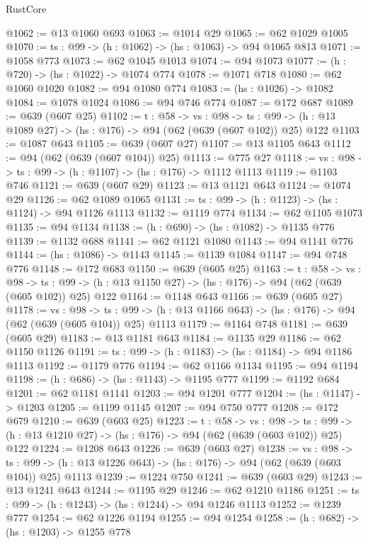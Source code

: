 \begin{lexlean}{RustCore}
\begin{coremodule}
@1062 := @13 @1060 @693
@1063 := @1014 @29
@1065 := @62 @1029 @1005
@1070 := {ts : @99} -> (h : @1062) -> (hs : @1063) -> @94 @1065 @813
@1071 := @1058 @773
@1073 := @62 @1045 @1013
@1074 := @94 @1073
@1077 := (h : @720) -> (hs : @1022) -> @1074 @774
@1078 := @1071 @718
@1080 := @62 @1060 @1020
@1082 := @94 @1080 @774
@1083 := (hs : @1026) -> @1082
@1084 := @1078 @1024
@1086 := @94 @746 @774
@1087 := @172 @687
@1089 := @639 (@607 @25)
@1102 := {t : @58} ->
  {vs : @98} ->
  {ts : @99} -> (h : @13 @1089 @27) -> (hs : @176) -> @94 (@62 (@639 (@607 @102)) @25) @122
@1103 := @1087 @643
@1105 := @639 (@607 @27)
@1107 := @13 @1105 @643
@1112 := @94 (@62 (@639 (@607 @104)) @25)
@1113 := @775 @27
@1118 := {vs : @98} -> {ts : @99} -> (h : @1107) -> (hs : @176) -> @1112 @1113
@1119 := @1103 @746
@1121 := @639 (@607 @29)
@1123 := @13 @1121 @643
@1124 := @1074 @29
@1126 := @62 @1089 @1065
@1131 := {ts : @99} -> (h : @1123) -> (hs : @1124) -> @94 @1126 @1113
@1132 := @1119 @774
@1134 := @62 @1105 @1073
@1135 := @94 @1134
@1138 := (h : @690) -> (hs : @1082) -> @1135 @776
@1139 := @1132 @688
@1141 := @62 @1121 @1080
@1143 := @94 @1141 @776
@1144 := (hs : @1086) -> @1143
@1145 := @1139 @1084
@1147 := @94 @748 @776
@1148 := @172 @683
@1150 := @639 (@605 @25)
@1163 := {t : @58} ->
  {vs : @98} ->
  {ts : @99} -> (h : @13 @1150 @27) -> (hs : @176) -> @94 (@62 (@639 (@605 @102)) @25) @122
@1164 := @1148 @643
@1166 := @639 (@605 @27)
@1178 := {vs : @98} ->
  {ts : @99} -> (h : @13 @1166 @643) -> (hs : @176) -> @94 (@62 (@639 (@605 @104)) @25) @1113
@1179 := @1164 @748
@1181 := @639 (@605 @29)
@1183 := @13 @1181 @643
@1184 := @1135 @29
@1186 := @62 @1150 @1126
@1191 := {ts : @99} -> (h : @1183) -> (hs : @1184) -> @94 @1186 @1113
@1192 := @1179 @776
@1194 := @62 @1166 @1134
@1195 := @94 @1194
@1198 := (h : @686) -> (hs : @1143) -> @1195 @777
@1199 := @1192 @684
@1201 := @62 @1181 @1141
@1203 := @94 @1201 @777
@1204 := (hs : @1147) -> @1203
@1205 := @1199 @1145
@1207 := @94 @750 @777
@1208 := @172 @679
@1210 := @639 (@603 @25)
@1223 := {t : @58} ->
  {vs : @98} ->
  {ts : @99} -> (h : @13 @1210 @27) -> (hs : @176) -> @94 (@62 (@639 (@603 @102)) @25) @122
@1224 := @1208 @643
@1226 := @639 (@603 @27)
@1238 := {vs : @98} ->
  {ts : @99} -> (h : @13 @1226 @643) -> (hs : @176) -> @94 (@62 (@639 (@603 @104)) @25) @1113
@1239 := @1224 @750
@1241 := @639 (@603 @29)
@1243 := @13 @1241 @643
@1244 := @1195 @29
@1246 := @62 @1210 @1186
@1251 := {ts : @99} -> (h : @1243) -> (hs : @1244) -> @94 @1246 @1113
@1252 := @1239 @777
@1254 := @62 @1226 @1194
@1255 := @94 @1254
@1258 := (h : @682) -> (hs : @1203) -> @1255 @778

\end{coremodule}
\end{lexlean}
